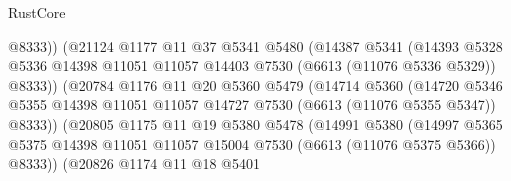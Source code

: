 \begin{lexlean}{RustCore}
\begin{coremodule}
                                  @8333))
                              (@21124
                                @1177
                                @11
                                @37
                                @5341
                                @5480
                                (@14387
                                  @5341
                                  (@14393
                                    @5328
                                    @5336
                                    @14398
                                    @11051
                                    @11057
                                    @14403
                                    @7530
                                    (@6613 (@11076 @5336 @5329))
                                    @8333))
                                (@20784
                                  @1176
                                  @11
                                  @20
                                  @5360
                                  @5479
                                  (@14714
                                    @5360
                                    (@14720
                                      @5346
                                      @5355
                                      @14398
                                      @11051
                                      @11057
                                      @14727
                                      @7530
                                      (@6613 (@11076 @5355 @5347))
                                      @8333))
                                  (@20805
                                    @1175
                                    @11
                                    @19
                                    @5380
                                    @5478
                                    (@14991
                                      @5380
                                      (@14997
                                        @5365
                                        @5375
                                        @14398
                                        @11051
                                        @11057
                                        @15004
                                        @7530
                                        (@6613 (@11076 @5375 @5366))
                                        @8333))
                                    (@20826
                                      @1174
                                      @11
                                      @18
                                      @5401

\end{coremodule}
\end{lexlean}
